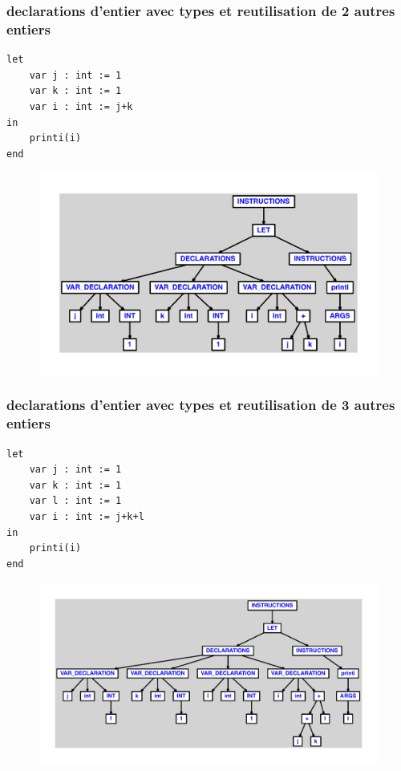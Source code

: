 \documentclass{article}
\begin{document}
\subsubsection{declarations d'entier avec types et reutilisation de 2 autres entiers}
\begin{lstlisting}
let
	var j : int := 1
	var k : int := 1
	var i : int := j+k
in
	printi(i)
end
\end{lstlisting}
\newpage
\begin{figure}[H]
\centering
\includegraphics[max width=\textwidth]{ast/ast_307.pdf}
\end{figure}
\newpage
\subsubsection{declarations d'entier avec types et reutilisation de 3 autres entiers}
\begin{lstlisting}
let
	var j : int := 1
	var k : int := 1
	var l : int := 1
	var i : int := j+k+l
in
	printi(i)
end
\end{lstlisting}
\newpage
\begin{figure}[H]
\centering
\includegraphics[max width=\textwidth]{ast/ast_308.pdf}
\end{figure}
\newpage
\end{document}
